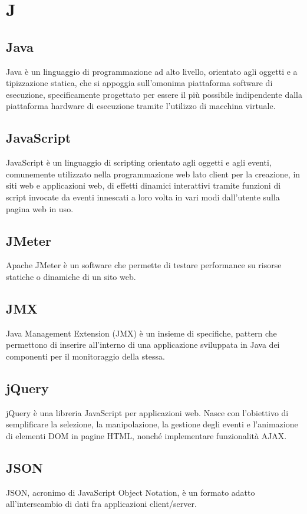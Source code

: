 \newpage \section{J}
\subsection{Java}  Java è un linguaggio di programmazione ad alto livello, orientato agli oggetti e a tipizzazione statica, che si appoggia sull'omonima piattaforma software di esecuzione, specificamente progettato per essere il più possibile indipendente dalla piattaforma hardware di esecuzione tramite l'utilizzo di macchina virtuale.
\subsection{JavaScript}  JavaScript è un linguaggio di scripting orientato agli oggetti e agli eventi, comunemente utilizzato nella programmazione web lato client per la creazione, in siti web e applicazioni web, di effetti dinamici interattivi tramite funzioni di script invocate da eventi innescati a loro volta in vari modi dall'utente sulla pagina web in uso. 
\subsection{JMeter}  Apache JMeter è un software che permette di testare performance su risorse statiche o dinamiche di un sito web.
\subsection{JMX}  Java Management Extension (JMX) è un insieme di specifiche, pattern che permettono di inserire all'interno di una applicazione sviluppata in Java dei componenti per il monitoraggio della stessa.
\subsection{jQuery}  jQuery è una libreria JavaScript per applicazioni web. Nasce con l'obiettivo di semplificare la selezione, la manipolazione, la gestione degli eventi e l'animazione di elementi DOM in pagine HTML, nonché implementare funzionalità AJAX.
\subsection{JSON }  JSON, acronimo di JavaScript Object Notation, è un formato adatto all'interscambio di dati fra applicazioni client/server.

